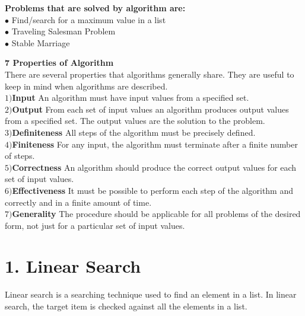 \documentclass[11pt]{article}
\theoremstyle{plain}
\theoremstyle{definition}
\begin{document}
\textbf{Problems that are solved by algorithm are:}\\
[1mm]
	$\bullet$ Find/search for a maximum value in a list\\
	$\bullet$ Traveling Salesman Problem\\
	$\bullet$ Stable Marriage

\bigbreak
\textbf{7 Properties of Algorithm \cite{rosen:1}}\\
[1.5mm]
There are several properties that algorithms generally share. They are useful to keep in mind when algorithms are described.\\

$1)$\textbf{Input}  An algorithm must have input values from a specified set.\\
	[1mm]
$2)$\textbf{Output}  From each set of input values an algorithm 		produces output values from a specified set. The output values are the 		solution to the problem.\\
	[1mm]
$3)$\textbf{Definiteness}  All steps of the algorithm must be precisely defined.\\
	[1mm]
$4)$\textbf{Finiteness}  For any input, the algorithm must terminate after a finite number of steps.\\
	[1mm]
$5)$\textbf{Correctness}  An algorithm should produce the correct output values for each set of input values.\\
	[1mm]
$6)$\textbf{Effectiveness}  It must be possible to perform each step of the algorithm and correctly and in a finite amount of time.\\
	[1mm]
$7)$\textbf{Generality}  The procedure should be applicable for all problems of the desired form, not just for a particular set of input values.\\





	





\section*{1. Linear Search}
Linear search is a searching technique used to find an element in a list. In linear search, the target item is checked against all the elements in a list.
\end{document}
